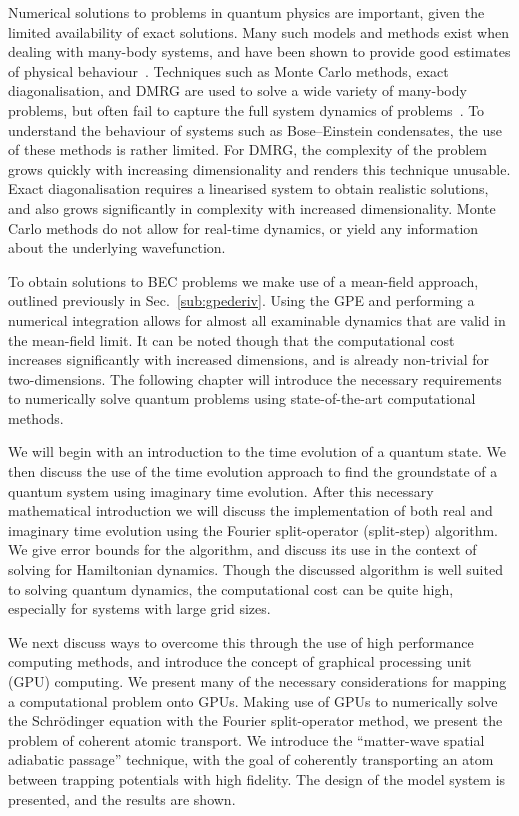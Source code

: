 Numerical solutions to problems in quantum physics are important, given the limited availability of exact solutions. Many such models and methods exist when dealing with many-body systems, and have been shown to provide good estimates of physical behaviour~\cite{BK:Krauth_2006}. Techniques such as Monte Carlo methods, exact diagonalisation, and DMRG are used to solve a wide variety of many-body problems, but often fail to capture the full system dynamics of problems~\cite{NUM:Schollwock_rmp_2005}. To understand the behaviour of systems such as Bose--Einstein condensates, the use of these methods is rather limited. For DMRG, the complexity of the problem grows quickly with increasing dimensionality and renders this technique unusable. Exact diagonalisation requires a linearised system to obtain realistic solutions, and also grows significantly in complexity with increased dimensionality. Monte Carlo methods do not allow for real-time dynamics, or yield any information about the underlying wavefunction.

To obtain solutions to BEC problems we make use of a mean-field approach, outlined previously in Sec.~\ref{sub:gpederiv}. Using the GPE and performing a numerical integration allows for almost all examinable dynamics that are valid in the mean-field limit. It can be noted though that the computational cost increases significantly with increased dimensions, and is already non-trivial for two-dimensions. The following chapter will introduce the necessary requirements to numerically solve quantum problems using state-of-the-art computational methods.

We will begin with an introduction to the time evolution of a quantum state. We then discuss the use of the time evolution approach to find the groundstate of a quantum system using imaginary time evolution. After this necessary mathematical introduction we will discuss the implementation of both real and imaginary time evolution using the Fourier split-operator (split-step) algorithm. We give error bounds for the algorithm, and discuss its use in the context of solving for Hamiltonian dynamics. Though the discussed algorithm is well suited to solving quantum dynamics, the computational cost can be quite high, especially for systems with large grid sizes.

We next discuss ways to overcome this through the use of high performance computing methods, and introduce the concept of graphical processing unit (GPU) computing. We present many of the necessary considerations for mapping a computational problem onto GPUs. Making use of GPUs to numerically solve the Schr\"odinger equation with the Fourier split-operator method, we present the problem of coherent atomic transport. We introduce the ``matter-wave spatial adiabatic passage'' technique, with the goal of coherently transporting an atom between trapping potentials with high fidelity. The design of the model system is presented, and the results are shown.

